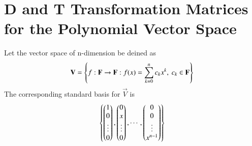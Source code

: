 \documentclass[journal,12pt,twocolumn]{IEEEtran}
\begin{document}
\section{D and T Transformation Matrices for the Polynomial Vector Space}
Let the vector space of n-dimension be deined as
\begin{align}
        \mathbf{V}=\left\{f:\mathbf{F}\rightarrow \mathbf{F} : f(x)=\sum_{k=0}^{n}c_kx^k, \ c_k \in \mathbf{F} \right\}
\end{align}
The corresponding standard basis for $\vec{V}$ is
\begin{align}
	\left\{\begin{pmatrix}1\\0\\\vdots\\0\end{pmatrix},\begin{pmatrix}0\\x\\\vdots\\0\end{pmatrix},\cdots,\begin{pmatrix}0\\0\\\vdots\\x^{n-1}\end{pmatrix}\right\}
\end{align}
\end{document}
